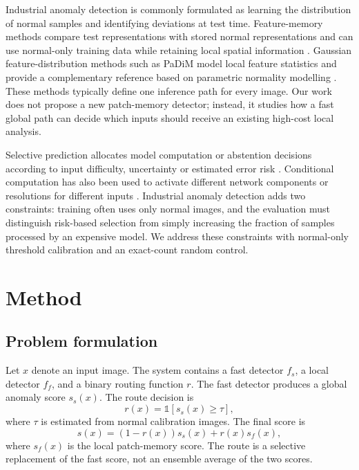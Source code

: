\documentclass[preprint,12pt]{elsarticle}
\begin{document}
Industrial anomaly detection is commonly formulated as learning the distribution of normal samples and identifying deviations at test time. Feature-memory methods compare test representations with stored normal representations and can use normal-only training data while retaining local spatial information \cite{mvtec,patchcore}. Gaussian feature-distribution methods such as PaDiM model local feature statistics and provide a complementary reference based on parametric normality modelling \cite{padim}. These methods typically define one inference path for every image. Our work does not propose a new patch-memory detector; instead, it studies how a fast global path can decide which inputs should receive an existing high-cost local analysis.

Selective prediction allocates model computation or abstention decisions according to input difficulty, uncertainty or estimated error risk \cite{selective}. Conditional computation has also been used to activate different network components or resolutions for different inputs \cite{conditional}. Industrial anomaly detection adds two constraints: training often uses only normal images, and the evaluation must distinguish risk-based selection from simply increasing the fraction of samples processed by an expensive model. We address these constraints with normal-only threshold calibration and an exact-count random control.

\section{Method}

\subsection{Problem formulation}

Let $x$ denote an input image. The system contains a fast detector $f_s$, a local detector $f_f$, and a binary routing function $r$. The fast detector produces a global anomaly score $s_s(x)$. The route decision is
\begin{equation}
r(x)=\mathbb{1}[s_s(x)\geq\tau],
\end{equation}
where $\tau$ is estimated from normal calibration images. The final score is
\begin{equation}
s(x)=(1-r(x))s_s(x)+r(x)s_f(x),
\end{equation}
where $s_f(x)$ is the local patch-memory score. The route is a selective replacement of the fast score, not an ensemble average of the two scores.
\end{document}
